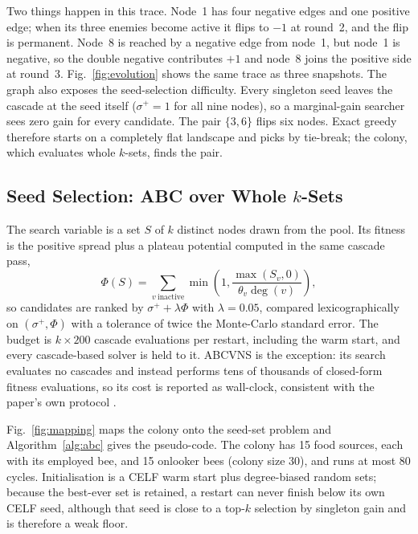 \documentclass[journal,letterpaper,10pt]{IEEEtran}
\begin{document}
Two things happen in this trace. Node~1 has four negative edges and one positive edge; when its three enemies become active it flips to $-1$ at round~2, and the flip is permanent. Node~8 is reached by a negative edge from node~1, but node~1 is negative, so the double negative contributes $+1$ and node~8 joins the positive side at round~3. Fig.~\ref{fig:evolution} shows the same trace as three snapshots. The graph also exposes the seed-selection difficulty. Every singleton seed leaves the cascade at the seed itself ($\sigma^{+}=1$ for all nine nodes), so a marginal-gain searcher sees zero gain for every candidate. The pair $\{3,6\}$ flips six nodes. Exact greedy therefore starts on a completely flat landscape and picks by tie-break; the colony, which evaluates whole $k$-sets, finds the pair.

\subsection{Seed Selection: ABC over Whole $k$-Sets}

The search variable is a set $S$ of $k$ distinct nodes drawn from the pool. Its fitness is the positive spread plus a plateau potential computed in the same cascade pass,
\begin{equation}
\Phi(S)=\sum_{v\ \text{inactive}}\min\!\left(1,\frac{\max(S_v,0)}{\theta_v\deg(v)}\right),
\label{eq:phi}
\end{equation}
so candidates are ranked by $\sigma^{+}+\lambda\Phi$ with $\lambda=0.05$, compared lexicographically on $(\sigma^{+},\Phi)$ with a tolerance of twice the Monte-Carlo standard error. The budget is $k\times200$ cascade evaluations per restart, including the warm start, and every cascade-based solver is held to it. ABCVNS is the exception: its search evaluates no cascades and instead performs tens of thousands of closed-form fitness evaluations, so its cost is reported as wall-clock, consistent with the paper's own protocol \cite{tang2026}.

Fig.~\ref{fig:mapping} maps the colony onto the seed-set problem and Algorithm~\ref{alg:abc} gives the pseudo-code. The colony has 15 food sources, each with its employed bee, and 15 onlooker bees (colony size 30), and runs at most 80 cycles. Initialisation is a CELF warm start plus degree-biased random sets; because the best-ever set is retained, a restart can never finish below its own CELF seed, although that seed is close to a top-$k$ selection by singleton gain and is therefore a weak floor.
\end{document}
